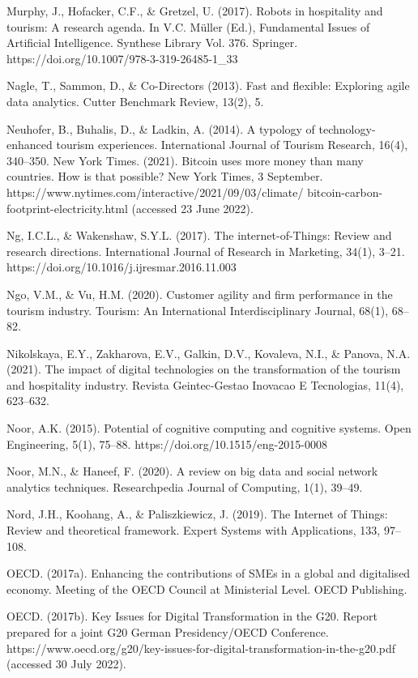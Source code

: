\documentclass[
  letterpaper,
  DIV=11,
  numbers=noendperiod]{scrreprt}
\begin{document}
Murphy, J., Hofacker, C.F., \& Gretzel, U. (2017). Robots in hospitality
and tourism: A research agenda. In V.C. Müller (Ed.), Fundamental Issues
of Artificial Intelligence. Synthese Library Vol. 376. Springer.
https://doi.org/10.1007/978-3-319-26485-1\_33

Nagle, T., Sammon, D., \& Co-Directors (2013). Fast and flexible:
Exploring agile data analytics. Cutter Benchmark Review, 13(2), 5.

Neuhofer, B., Buhalis, D., \& Ladkin, A. (2014). A typology of
technology-enhanced tourism experiences. International Journal of
Tourism Research, 16(4), 340--350. New York Times. (2021). Bitcoin uses
more money than many countries. How is that possible? New York Times, 3
September. https://www.nytimes.com/interactive/2021/09/03/climate/
bitcoin-carbon-footprint-electricity.html (accessed 23 June 2022).

Ng, I.C.L., \& Wakenshaw, S.Y.L. (2017). The internet-of-Things: Review
and research directions. International Journal of Research in Marketing,
34(1), 3--21. https://doi.org/10.1016/j.ijresmar.2016.11.003

Ngo, V.M., \& Vu, H.M. (2020). Customer agility and firm performance in
the tourism industry. Tourism: An International Interdisciplinary
Journal, 68(1), 68--82.

Nikolskaya, E.Y., Zakharova, E.V., Galkin, D.V., Kovaleva, N.I., \&
Panova, N.A. (2021). The impact of digital technologies on the
transformation of the tourism and hospitality industry. Revista
Geintec-Gestao Inovacao E Tecnologias, 11(4), 623--632.

Noor, A.K. (2015). Potential of cognitive computing and cognitive
systems. Open Engineering, 5(1), 75--88.
https://doi.org/10.1515/eng-2015-0008

Noor, M.N., \& Haneef, F. (2020). A review on big data and social
network analytics techniques. Researchpedia Journal of Computing, 1(1),
39--49.

Nord, J.H., Koohang, A., \& Paliszkiewicz, J. (2019). The Internet of
Things: Review and theoretical framework. Expert Systems with
Applications, 133, 97--108.

OECD. (2017a). Enhancing the contributions of SMEs in a global and
digitalised economy. Meeting of the OECD Council at Ministerial Level.
OECD Publishing.

OECD. (2017b). Key Issues for Digital Transformation in the G20. Report
prepared for a joint G20 German Presidency/OECD Conference.
https://www.oecd.org/g20/key-issues-for-digital-transformation-in-the-g20.pdf
(accessed 30 July 2022).
\end{document}
